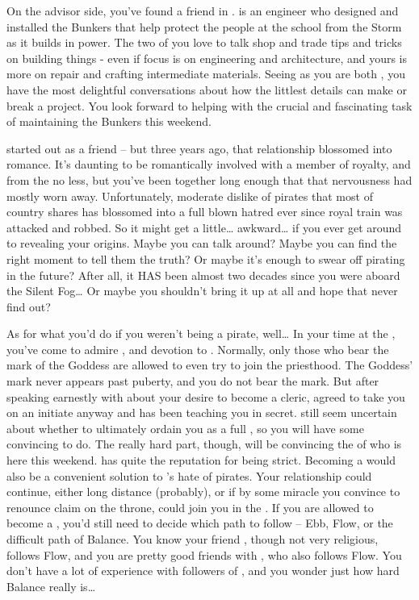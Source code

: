 \documentclass[char]{GL2020}
\begin{document}
On the advisor side, you've found a friend in \cBunker{\full}. \cBunker{} is an engineer who designed and installed the Bunkers that help protect the people at the school from the Storm as it builds in power. The two of you love to talk shop and trade tips and tricks on building things - even if \cBunker{\their} focus is on engineering and architecture, and yours is more on repair and crafting intermediate materials. Seeing as you are both \pShippies{}, you have the most delightful conversations about how the littlest details can make or break a project. You look forward to helping \cBunker{} with the crucial and fascinating task of maintaining the Bunkers this weekend.

\cPrince{\full} started out as a friend -- but three years ago, that relationship blossomed into romance. It's daunting to be romantically involved with a member of royalty, and from the \pFarm{} no less, but you've been together long enough that that nervousness had mostly worn away. Unfortunately, \cPrince{\their} moderate dislike of pirates that most of \cPrince{\their} country shares has blossomed into a full blown hatred ever since \cPrince{\their} royal train was attacked and \cPrince{\they} \cPrince{\were} robbed. So it might get a little\ldots{} awkward\ldots{} if you ever get around to revealing your origins. Maybe you can talk \cPrince{\them} around? Maybe you can find the right moment to tell them the truth? Or maybe it's enough to swear off pirating in the future? After all, it HAS been almost two decades since you were aboard the Silent Fog\ldots{} Or maybe you shouldn't bring it up at all and hope that \cPirate{\they} never find\cPirate{\plural} out?

As for what you'd do if you weren't being a pirate, well\ldots{} In your time at the \pSc{}, you've come to admire \cFlowPriest{\full}, and \cFlowPriest{\their} devotion to \cFlow{}. Normally, only those who bear the mark of the Goddess are allowed to even try to join the priesthood. The Goddess' mark never appears past puberty, and you do not bear the mark. But after speaking earnestly with \cFlowPriest{} about your desire to become a cleric, \cFlowPriest{\they} agreed to take you on an initiate anyway and has been teaching you in secret. \cFlowPriest{\They} still seem\cFlowPriest{\plural} uncertain about whether to ultimately ordain you as a full \cPirate{\cleric}, so you will have some convincing to do. The really hard part, though, will be convincing the \cEbbPriest{\cleric} of \cEbb{} who is here this weekend. \cEbbPriest{\full} has quite the reputation for being strict. Becoming a \cPirate{\cleric} would also be a convenient solution to \cPrince{}'s hate of pirates. Your relationship could continue, either long distance (probably), or if by some miracle you convince \cPrince{} to renounce \cPrince{\their} claim on the throne, \cPrince{\they} could join you in the \pShip{}. If you are allowed to become a \cPirate{\cleric} , you'd still need to decide which path to follow -- Ebb, Flow, or the difficult path of Balance. You know your friend \cBunker{}, though not very religious, follows Flow, and you are pretty good friends with \cFlowPriest{}, who also follows Flow. You don't have a lot of experience with followers of \cEbb{}, and you wonder just how hard Balance really is\ldots{}
\end{document}
